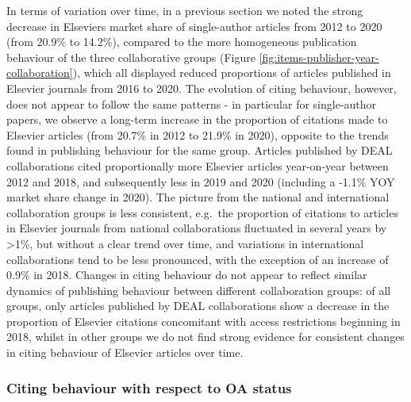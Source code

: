 \documentclass[
]{article}
\begin{document}
In terms of variation over time, in a previous section we noted the strong decrease in Elsevier\textquotesingle s market share of single-author articles from 2012 to 2020 (from 20.9\% to 14.2\%), compared to the more homogeneous publication behaviour of the three collaborative groups (Figure \ref{fig:items-publisher-year-collaboration}), which all displayed reduced proportions of articles published in Elsevier journals from 2016 to 2020. The evolution of citing behaviour, however, does not appear to follow the same patterns - in particular for single-author papers, we observe a long-term increase in the proportion of citations made to Elsevier articles (from 20.7\% in 2012 to 21.9\% in 2020), opposite to the trends found in publishing behaviour for the same group. Articles published by DEAL collaborations cited proportionally more Elsevier articles year-on-year between 2012 and 2018, and subsequently less in 2019 and 2020 (including a -1.1\% YOY market share change in 2020). The picture from the national and international collaboration groups is less consistent, e.g.~the proportion of citations to articles in Elsevier journals from national collaborations fluctuated in several years by \textgreater1\%, but without a clear trend over time, and variations in international collaborations tend to be less pronounced, with the exception of an increase of 0.9\% in 2018. Changes in citing behaviour do not appear to reflect similar dynamics of publishing behaviour between different collaboration groups: of all groups, only articles published by DEAL collaborations show a decrease in the proportion of Elsevier citations concomitant with access restrictions beginning in 2018, whilst in other groups we do not find strong evidence for consistent changes in citing behaviour of Elsevier articles over time.

\hypertarget{citing-behaviour-with-respect-to-oa-status}{%
\subsubsection{Citing behaviour with respect to OA status}\label{citing-behaviour-with-respect-to-oa-status}}
\end{document}
